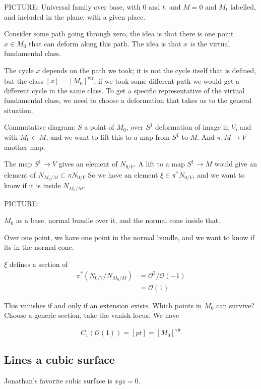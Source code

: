 \documentclass{amsart}
\theoremstyle{definition}
\newcommand{\OO}{\mathcal{O}}
\newcommand{\vir}{\text{vir}}
\begin{document}
PICTURE: Universal family over base, with $0$ and $t$, and $M=0$ and $M_t$ labelled, and included in the plane, with a given place.



Consider some path going through zero, the idea is that there is one point $x\in M_0$ that can deform along this path.  The idea is that $x$ \emph{is} the virtual fundamental class.

The cycle $x$ depends on the path we took; it is not the cycle itself that is defined, but the class $[x]=[M_0]^\vir$; if we took some different path we would get a different cycle in the same class.  To get a specific representative of the virtual fundamental class, we need to choose a deformation that takes us to the general situation.








Commutative diagram: $S$ a point of $M_0$, over $S^1$ deformation of image in $V$, and with $M_0\subset M$, and we want to lift this to a map from $S^1$ to $M$.  And $\pi:M\to V$ another map.

The map $S^1\to V$ gives an element of $N_{0/V}$.  
A lift to a map $S^1\to M$ would give an element of $N_{M_0/M}\subset \pi N_{0/V}$
So we have an element $\xi\in\pi^* N_{0/V}$, and we want to know if it is inside $N_{M_0/M}$.

PICTURE:


$M_0$ as a base, normal bundle over it, and the normal cone inside that.

Over one point, we have one point in the normal bundle, and we want to know if its in the normal cone.


$\xi$ defines a section of 
\begin{align*}
\pi^*(N_{0/V} / N_{M_0/M})&=\OO^2/\OO(-1) \\
&=\OO(1)
\end{align*}

This vanishes if and only if an extension exists.  Which points in $M_0$ can survive?  Choose a generic section, take the vanish locus.  We have

$$C_1(\OO(1))=[pt]=[M_0]^\vir$$

\subsection{Lines a cubic surface}

Jonathan's favorite cubic surface is $xyz=0$.
\end{document}
